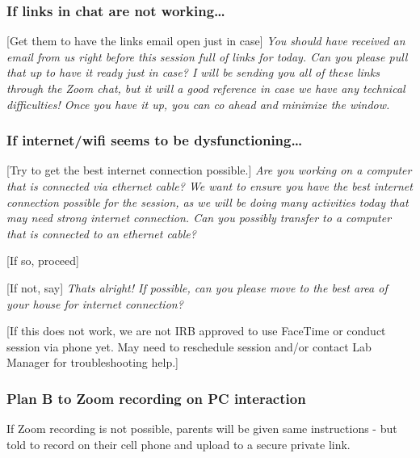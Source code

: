 \documentclass[]{book}
\begin{document}
\hypertarget{if-links-in-chat-are-not-working}{%
\subsubsection{If links in chat are not working\ldots{}}\label{if-links-in-chat-are-not-working}}

{[}Get them to have the links email open just in case{]}
\emph{You should have received an email from us right before this session full of links for today. Can you please pull that up to have it ready just in case? I will be sending you all of these links through the Zoom chat, but it will a good reference in case we have any technical difficulties! Once you have it up, you can co ahead and minimize the window.}

\hypertarget{if-internetwifi-seems-to-be-dysfunctioning}{%
\subsubsection{If internet/wifi seems to be dysfunctioning\ldots{}}\label{if-internetwifi-seems-to-be-dysfunctioning}}

{[}Try to get the best internet connection possible.{]}
\emph{Are you working on a computer that is connected via ethernet cable? We want to ensure you have the best internet connection possible for the session, as we will be doing many activities today that may need strong internet connection. Can you possibly transfer to a computer that is connected to an ethernet cable?}

{[}If so, proceed{]}

{[}If not, say{]} \emph{Thats alright! If possible, can you please move to the best area of your house for internet connection?}

{[}If this does not work, we are not IRB approved to use FaceTime or conduct session via phone yet. May need to reschedule session and/or contact Lab Manager for troubleshooting help.{]}

\hypertarget{plan-b-to-zoom-recording-on-pc-interaction}{%
\subsubsection{Plan B to Zoom recording on PC interaction}\label{plan-b-to-zoom-recording-on-pc-interaction}}

If Zoom recording is not possible, parents will be given same instructions - but told to record on their cell phone and upload to a secure private link.
\end{document}
